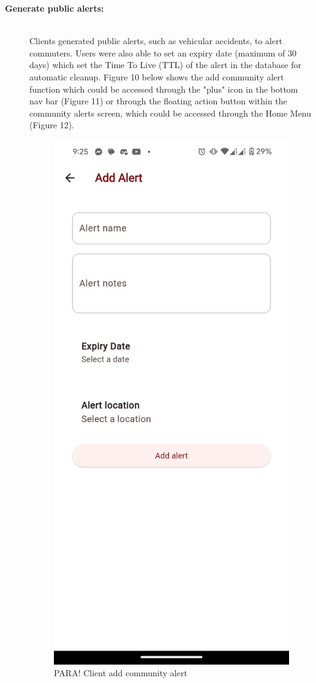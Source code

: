 \documentclass[journal]{./IEEE/IEEEtran}
\begin{document}
\begin{description}
    \item[\textbf{Generate public alerts:}] \hfill \\
        Clients generated public alerts, such as vehicular accidents, to alert commuters. Users were also able to set an expiry date (maximum of 30 days) which set the Time To Live (TTL) of the alert in the database for automatic cleanup.
        Figure 10 below shows the add community alert function which could be accessed through the "plus" icon in the bottom nav bar (Figure 11) or through the floating action button within the community alerts screen, which could be accessed through the Home Menu (Figure 12).

\begin{figure}[!h]
    \centering
        \includegraphics[scale=0.1]{./figures/client/add alert.png}
    \caption{PARA! Client add community alert}
\end{figure}


\end{description}
\end{document}
